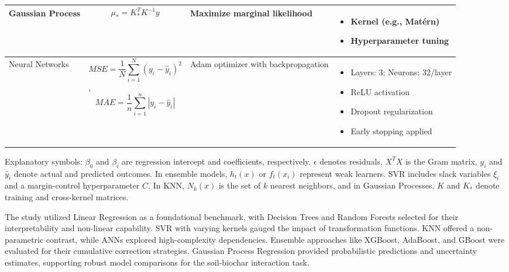 \documentclass[12pt,a4paper]{article}
\begin{document}
{\begin{longtable}{C{1.5cm} J{4.5cm} C{4cm} C{4cm}}
			\hline
			Gaussian Process & 
			\begin{equation}
				\mu_* = K_*^T K^{-1} y
			\end{equation} 
			& Maximize marginal likelihood & 
			\begin{itemize}
				\item Kernel (e.g., Matérn)
				\item Hyperparameter tuning
			\end{itemize} \\
			\hline
			Neural Networks & 
			\begin{equation}
				MSE = \frac{1}{N} \sum_{i=1}^{N} (y_i - \hat{y}_i)^2
			\end{equation}, 
			\begin{equation}
				MAE = \frac{1}{n} \sum_{i=1}^{n} |y_i - \hat{y}_i|
			\end{equation} 
			& Adam optimizer with backpropagation & 
			\begin{itemize}
				\item Layers: 3; Neurons: 32/layer
				\item ReLU activation
				\item Dropout regularization
				\item Early stopping applied
			\end{itemize} \\
	\end{longtable}}
	
	\hspace{1.3cm} Explanatory symbols: $\beta_0$ and $\beta_i$ are regression intercept and coefficients, respectively. $\epsilon$ denotes residuals, $X^TX$ is the Gram matrix, $y_i$ and $\hat{y}_i$ denote actual and predicted outcomes. In ensemble models, $h_t(x)$ or $f_t(x_i)$ represent weak learners. SVR includes slack variables $\xi_i$ and a margin-control hyperparameter $C$. In KNN, $N_k(x)$ is the set of $k$ nearest neighbors, and in Gaussian Processes, $K$ and $K_*$ denote training and cross-kernel matrices.
	
	\hspace{1.3cm} The study utilized Linear Regression as a foundational benchmark, with Decision Trees and Random Forests selected for their interpretability and non-linear capability. SVR with varying kernels gauged the impact of transformation functions. KNN offered a non-parametric contrast, while ANNs explored high-complexity dependencies. Ensemble approaches like XGBoost, AdaBoost, and GBoost were evaluated for their cumulative correction strategies. Gaussian Process Regression provided probabilistic predictions and uncertainty estimates, supporting robust model comparisons for the soil-biochar interaction task.
	
\end{document}
